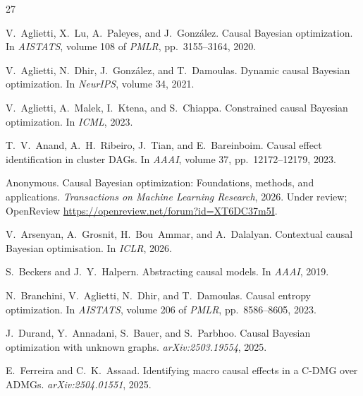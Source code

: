 \documentclass[twoside]{article}
\begin{document}

\begin{thebibliography}{27}

V.~Aglietti, X.~Lu, A.~Paleyes, and J.~Gonz{\'a}lez.
\newblock Causal {B}ayesian optimization.
\newblock In \emph{AISTATS}, volume 108 of \emph{PMLR}, pp.\ 3155--3164, 2020.

V.~Aglietti, N.~Dhir, J.~Gonz{\'a}lez, and T.~Damoulas.
\newblock Dynamic causal {B}ayesian optimization.
\newblock In \emph{NeurIPS}, volume 34, 2021.

V.~Aglietti, A.~Malek, I.~Ktena, and S.~Chiappa.
\newblock Constrained causal {B}ayesian optimization.
\newblock In \emph{ICML}, 2023.

T.~V.~Anand, A.~H.~Ribeiro, J.~Tian, and E.~Bareinboim.
\newblock Causal effect identification in cluster {DAG}s.
\newblock In \emph{AAAI}, volume 37, pp.\ 12172--12179, 2023.

Anonymous.
\newblock Causal {B}ayesian optimization: Foundations, methods, and applications.
\newblock \emph{Transactions on Machine Learning Research}, 2026.
\newblock Under review; OpenReview \url{https://openreview.net/forum?id=XT6DC37m5I}.

V.~Arsenyan, A.~Grosnit, H.~Bou~Ammar, and A.~Dalalyan.
\newblock Contextual causal {B}ayesian optimisation.
\newblock In \emph{ICLR}, 2026.

S.~Beckers and J.~Y.~Halpern.
\newblock Abstracting causal models.
\newblock In \emph{AAAI}, 2019.

N.~Branchini, V.~Aglietti, N.~Dhir, and T.~Damoulas.
\newblock Causal entropy optimization.
\newblock In \emph{AISTATS}, volume 206 of \emph{PMLR}, pp.\ 8586--8605, 2023.

J.~Durand, Y.~Annadani, S.~Bauer, and S.~Parbhoo.
\newblock Causal {B}ayesian optimization with unknown graphs.
\newblock \emph{arXiv:2503.19554}, 2025.

E.~Ferreira and C.~K.~Assaad.
\newblock Identifying macro causal effects in a {C-DMG} over {ADMG}s.
\newblock \emph{arXiv:2504.01551}, 2025.


\end{thebibliography}
\end{document}
